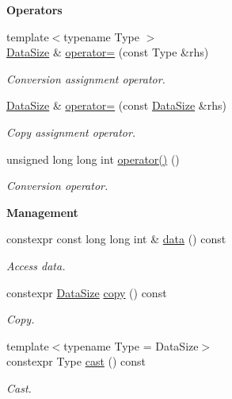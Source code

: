 \begin{Indent}{\bf Operators}\par
\begin{DoxyCompactItemize}
\item 
{\footnotesize template$<$typename Type $>$ }\\\hyperlink{exceptionmagrathea_1_1DataSize}{Data\-Size} \& \hyperlink{exceptionmagrathea_1_1DataSize_a0fd84c6806ce037a4483c3596cfaf380}{operator=} (const Type \&rhs)
\begin{DoxyCompactList}\small\item\em Conversion assignment operator. \end{DoxyCompactList}\item 
\hyperlink{exceptionmagrathea_1_1DataSize}{Data\-Size} \& \hyperlink{exceptionmagrathea_1_1DataSize_a5313635e436d3f1645e26d3dd6e74b82}{operator=} (const \hyperlink{exceptionmagrathea_1_1DataSize}{Data\-Size} \&rhs)
\begin{DoxyCompactList}\small\item\em Copy assignment operator. \end{DoxyCompactList}\item 
unsigned long long int \hyperlink{exceptionmagrathea_1_1DataSize_a7f75549fdf34e7386fbd5129f0366e7d}{operator()} ()
\begin{DoxyCompactList}\small\item\em Conversion operator. \end{DoxyCompactList}\end{DoxyCompactItemize}
\end{Indent}
\begin{Indent}{\bf Management}\par
\begin{DoxyCompactItemize}
\item 
constexpr const long long int \& \hyperlink{exceptionmagrathea_1_1DataSize_a83002f4eff626baefb0a76efcee41da4}{data} () const 
\begin{DoxyCompactList}\small\item\em Access data. \end{DoxyCompactList}\item 
constexpr \hyperlink{exceptionmagrathea_1_1DataSize}{Data\-Size} \hyperlink{exceptionmagrathea_1_1DataSize_ad604ec3c72b03f7523ab7ec8ffa652f0}{copy} () const 
\begin{DoxyCompactList}\small\item\em Copy. \end{DoxyCompactList}\item 
{\footnotesize template$<$typename Type  = Data\-Size$>$ }\\constexpr Type \hyperlink{exceptionmagrathea_1_1DataSize_a26d4a1ef59546650acba811bd1ae5547}{cast} () const 
\begin{DoxyCompactList}\small\item\em Cast. \end{DoxyCompactList}\end{DoxyCompactItemize}
\end{Indent}
